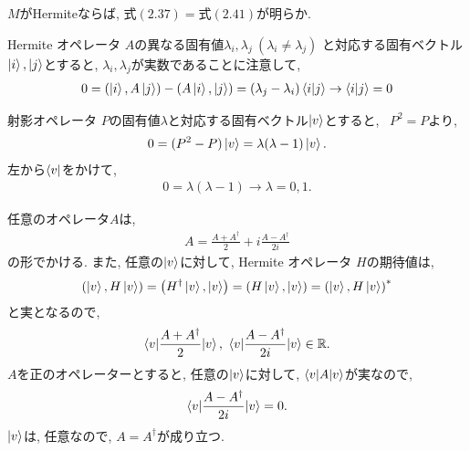 \begin{ex}
    \label{ex2.21}
    $M$がHermiteならば, $\mathrm{式}(2.37)=\mathrm{式}(2.41)$が明らか.
\end{ex}


\begin{ex}
    \label{ex2.22}
    Hermite オペレータ $A$の異なる固有値$\lambda_i, \lambda_j \ (\lambda_i \neq \lambda_j)$
    と対応する固有ベクトル$\ket{i}, \ket{j}$とすると, $\lambda_i, \lambda_j$が実数であることに注意して,
    \begin{align*}
        0 = \left(\ket{i}, A \ket{j} \right) - \left( A \ket{i}, \ket{j} \right) = (\lambda_j - \lambda_i) \braket{i|j}
        \to
        \braket{i|j} = 0
    \end{align*}
\end{ex}

\begin{ex}
    \label{ex2.23}
    射影オペレータ $P$の固有値$\lambda$と対応する固有ベクトル$\ket{v}$とすると, \ $P^2=P$より,
    \begin{align*}
        0 = (P^2 - P)\ket{v} = \lambda(\lambda-1)\ket{v}.
    \end{align*}
    左から$\bra{v}$をかけて,
    \begin{align*}
        0 = \lambda(\lambda-1) \to \lambda = 0,1.
    \end{align*}
\end{ex}

\begin{ex}
    \label{ex2.24}
    任意のオペレータ$A$は,
    \begin{align*}
        A = \frac{A + A^\dagger}{2} + i \frac{A-A^\dagger}{2i}
    \end{align*}
    の形でかける.
    また, 任意の$\ket{v}$に対して, Hermite オペレータ $H$の期待値は,
    \begin{align*}
        \left( \ket{v}, H \ket{v} \right)
        = \left( H^\dagger \ket{v}, \ket{v} \right)
        = \left( H \ket{v}, \ket{v} \right)
        = \left( \ket{v}, H \ket{v} \right)^*
    \end{align*}
    と実となるので,
    \begin{align*}
        \braket{v|\frac{A + A^\dagger}{2}|v}
        ,\ \braket{v|\frac{A-A^\dagger}{2i}|v}
        \in \mathbb{R}.
    \end{align*}
    $A$を正のオペレーターとすると, 任意の$\ket{v}$に対して, $\braket{v|A|v}$が実なので, 
    \begin{align*}
        \braket{v|\frac{A-A^\dagger}{2i}|v} = 0.
    \end{align*}
    $\ket{v}$は, 任意なので, $A = A^\dagger$が成り立つ.
\end{ex}

